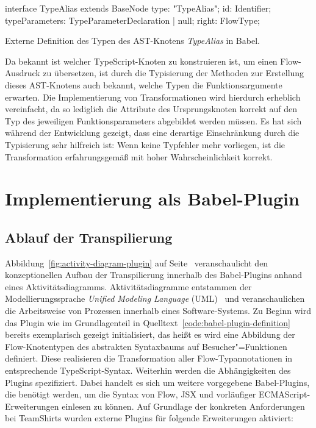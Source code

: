 \bigbreak
\begin{listing}[htb]
\begin{textcode}
interface TypeAlias extends BaseNode {
  type: "TypeAlias";
  id: Identifier;
  typeParameters: TypeParameterDeclaration | null;
  right: FlowType;
}
\end{textcode}
\listingvspace
\caption{Externe Definition des Typen des AST-Knotens \textit{TypeAlias} in Babel.}
\label{code:babel:static-types}
\end{listing}

Da bekannt ist welcher TypeScript-Knoten zu konstruieren ist, um einen Flow-Ausdruck zu übersetzen, ist durch die Typisierung der Methoden zur Erstellung dieses AST-Knotens auch bekannt, welche Typen die Funktionsargumente erwarten. Die Implementierung von Transformationen wird hierdurch erheblich vereinfacht, da so lediglich die Attribute des Ursprungsknoten korrekt auf den Typ des jeweiligen Funktionsparameters abgebildet werden müssen. Es hat sich während der Entwicklung gezeigt, dass eine derartige Einschränkung durch die Typisierung sehr hilfreich ist: Wenn keine Typfehler mehr vorliegen, ist die Transformation erfahrungsgemäß mit hoher Wahrscheinlichkeit korrekt.

\section{Implementierung als Babel-Plugin}

\subsection{Ablauf der Transpilierung}

Abbildung~\ref{fig:activity-diagram-plugin} auf Seite~\pageref{fig:activity-diagram-plugin} veranschaulicht den konzeptionellen Aufbau der Transpilierung innerhalb des Babel-Plugins anhand eines Aktivitätsdiagramms. Aktivitätsdiagramme entstammen der Modellierungssprache \textit{Unified Modeling Language} (UML)~\autocite{OMG:UML} und veranschaulichen die Arbeitsweise von Prozessen innerhalb eines Software-Systems. Zu Beginn wird das Plugin wie im Grundlagenteil in Quelltext~\ref{code:babel-plugin-definition} bereits exemplarisch gezeigt initialisiert, das heißt es wird eine Abbildung der Flow-Knotentypen des abstrakten Syntaxbaums auf Besucher"=Funktionen definiert. Diese realisieren die Transformation aller Flow-Typannotationen in entsprechende TypeScript-Syntax.
Weiterhin werden die Abhängigkeiten des Plugins spezifiziert. Dabei handelt es sich um weitere vorgegebene Babel-Plugins, die benötigt werden, um die Syntax von Flow, JSX und vorläufiger ECMAScript-Erweiterungen einlesen zu können. Auf Grundlage der konkreten Anforderungen bei TeamShirts wurden externe Plugins für folgende Erweiterungen aktiviert:

